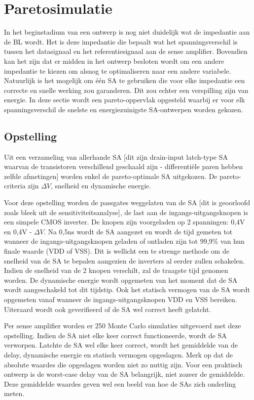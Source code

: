 \section{Paretosimulatie}
In het beginstadium van een ontwerp is nog niet duidelijk wat de impedantie aan de BL wordt. Het is deze impedantie die bepaalt wat het spanningsverschil is tussen het datasignaal en het referentiesignaal aan de sense amplifier. Bovendien kan het zijn dat er midden in het ontwerp besloten wordt om een andere impedantie te kiezen om alsnog te optimaliseren naar een andere variabele.
Natuurlijk is het mogelijk om één SA te gebruiken die voor elke impedantie een correcte en snelle werking zou garanderen. Dit zou echter een verspilling zijn van energie. In deze sectie wordt een pareto-oppervlak opgesteld waarbij er voor elk spanningsverschil de snelste en energiezuinigste SA-ontwerpen worden gekozen.

\subsection{Opstelling}
Uit een verzameling van allerhande SA [dit zijn drain-input latch-type SA waarvan de transistoren verschillend geschaald zijn - differentiële paren hebben zelfde afmetingen] worden enkel de pareto-optimale SA uitgekozen. De pareto-criteria zijn $\Delta V$, snelheid en dynamische energie. 

Voor deze opstelling worden de passgates weggelaten van de SA [dit is geoorloofd zoals bleek uit de sensitiviteitsanalyse], de last aan de ingangs-uitgangsknopen is een simpele CMOS inverter. De knopen zijn voorgeladen op 2 spanningen: 0,4V en 0,4V - $\Delta V$. Na 0,5ns wordt de SA aangezet en wordt de tijd gemeten tot wanneer de ingangs-uitgangsknopen geladen of ontladen zijn tot 99,9\% van hun finale waarde (VDD of VSS). Dit is wellicht een te strenge methode om de snelheid van de SA te bepalen aangezien de inverters al eerder zullen schakelen. Indien de snelheid van de 2 knopen verschilt, zal de traagste tijd genomen worden. De dynamische energie wordt opgemeten van het moment dat de SA wordt aangeschakeld tot dit tijdstip. Ook het statisch vermogen van de SA wordt opgemeten vanaf wanneer de ingangs-uitgangsknopen VDD en VSS bereiken. Uiteraard wordt ook geverifieerd of de SA wel correct heeft gelatcht.

Per sense amplifier worden er 250 Monte Carlo simulaties uitgevoerd met deze opstelling. Indien de SA niet elke keer correct functioneerde, wordt de SA verworpen. Latchte de SA wel elke keer correct, wordt het gemiddelde van de delay, dynamische energie  en statisch vermogen opgeslagen. Merk op dat de absolute waardes die opgeslagen worden niet zo nuttig zijn. Voor een praktisch ontwerp is de worst-case delay van de SA belangrijk, niet zozeer de gemiddelde. Deze gemiddelde waardes geven wel een beeld van hoe de SAs zich onderling meten.  

